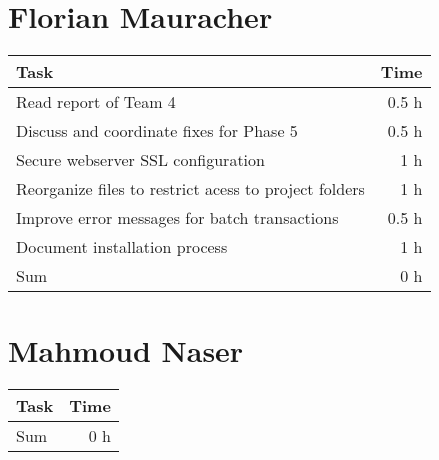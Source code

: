 \clearpage
\section*{Florian Mauracher}
\begin{table}[h!tpb]
  \centering
  \begin{tabularx}{\textwidth}{X r}
    \toprule
      Task & Time \\
    \midrule
      Read report of Team 4 & 0.5 h \\
      Discuss and coordinate fixes for Phase 5  & 0.5 h \\
      Secure webserver SSL configuration & 1 h \\
      Reorganize files to restrict acess to project folders & 1 h \\
      Improve error messages for batch transactions & 0.5 h \\
      Document installation process & 1 h \\
    \midrule
      Sum & 0 h \\
    \bottomrule
  \end{tabularx}
\end{table}

\clearpage
\section*{Mahmoud Naser}
\begin{table}[h!tpb]
  \centering
  \begin{tabularx}{\textwidth}{X r}
    \toprule
      Task & Time \\
    \midrule
    \midrule
      Sum & 0 h \\
    \bottomrule
  \end{tabularx}
\end{table}
